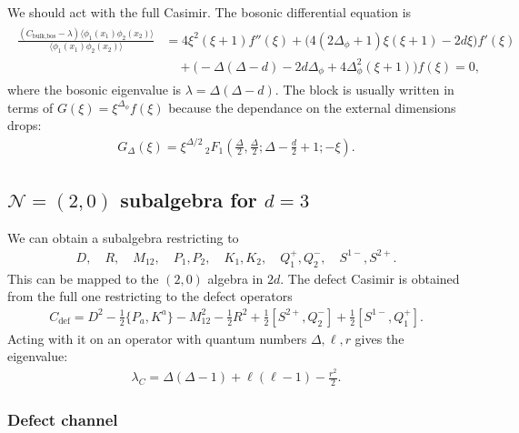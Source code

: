 \documentclass[letterpaper]{article}
\let\Oldsubsection\subsection
\renewcommand{\subsection}{\FloatBarrier\Oldsubsection}
\let\Oldsubsubsection\subsubsection
\renewcommand{\subsubsection}{\FloatBarrier\Oldsubsubsection}
\def\Nm{{\mathcal{N}}}
\begin{document}
We should act with the full Casimir. 
The bosonic differential equation is
\begin{align}
\begin{split}
 \frac{
 \left( C_{\text{bulk,bos}} - \lambda \right) \langle \phi_1(x_1) \phi_2(x_2)\rangle
 }{\langle \phi_1(x_1) \phi_2(x_2)\rangle}
 & = 4 \xi ^2 (\xi +1) f''(\xi )
   + \big( 4 (2 \Delta_\phi+1) \xi  (\xi +1) - 2 d \xi \big) f'(\xi ) \\
 & \quad 
   +  \big(-\Delta(\Delta -d)-2 d \Delta_\phi+4 \Delta_\phi^2 (\xi +1)\big) f(\xi )
   = 0,
\end{split}
\end{align}
where the bosonic eigenvalue is $\lambda = \Delta(\Delta - d)$.
The block is usually written in terms of $G(\xi) = \xi^{\Delta_\phi} f(\xi)$ because the dependance on the external dimensions drops:
\begin{align}
 G_\Delta(\xi)
 = \xi ^{\Delta /2} \, _2F_1\left(
    \frac{\Delta}{2},
    \frac{\Delta}{2};
    \Delta -\frac{d}{2} + 1;
    -\xi 
 \right).
\end{align}


\subsection{\texorpdfstring{$\Nm = (2, 0)$}{N=(2,0)} subalgebra 
for \texorpdfstring{$d = 3$}{d=3}}

We can obtain a subalgebra restricting to
\begin{align}
 D, \quad
 R, \quad
 M_{12}, \quad
 P_1, P_2, \quad
 K_1, K_2, \quad
 Q^+_1, Q^-_2, \quad
 S^{1-}, S^{2+}.
\end{align}
This can be mapped to the $(2,0)$ algebra in $2d$.
The defect Casimir is obtained from the full one restricting to the defect operators
\begin{align}
 C_{\text{def}} = 
    D^2
  - \frac12 \{ P_{a}, K^{a} \}
  - M_{12}^2
  - \frac12 R^2
  + \frac12 [ S^{2+}, Q^-_2]
  + \frac12 [ S^{1-}, Q^+_1].
\end{align}
Acting with it on an operator with quantum numbers $\Delta, \ell, r$ gives the eigenvalue:
\begin{align}
 \lambda_C 
 = \Delta (\Delta - 1)
 + \ell(\ell - 1)
 - \frac{r^2}{2}.
\end{align}


\subsubsection{Defect channel}
\end{document}
